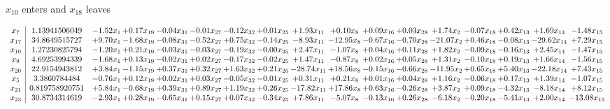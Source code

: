 \documentclass[9pt]{article}
\begin{document}
 $ x_{10} $ enters and $ x_{18} $ leaves 

 \[\begin{array}{c| c c@{\hskip 2pt} c@{\hskip 2pt} c@{\hskip 2pt} c@{\hskip 2pt} c@{\hskip 2pt} c@{\hskip 2pt} c@{\hskip 2pt} c@{\hskip 2pt} c@{\hskip 2pt} c@{\hskip 2pt} c@{\hskip 2pt} c@{\hskip 2pt} c@{\hskip 2pt} c@{\hskip 2pt} c@{\hskip 2pt} }
 x_{7}   &  1.13941506049 & -1.52 x_{1} & +  0.17 x_{19} & -0.04 x_{31} & -0.01 x_{27} & -0.12 x_{32} & +  0.01 x_{25} & +  1.93 x_{11} & +  0.10 x_{8} & +  0.09 x_{16} & +  0.03 x_{28} & +  1.74 x_{2} & -0.07 x_{18} & +  0.42 x_{13} & +  1.69 x_{14} & -1.48 x_{15}\\
 x_{17}   &  34.8649515727 & +  9.70 x_{1} & -1.68 x_{19} & -0.08 x_{31} & -0.52 x_{27} & +  0.75 x_{32} & -0.14 x_{25} & -8.93 x_{11} & -12.95 x_{8} & -0.67 x_{16} & -0.70 x_{28} & -21.07 x_{2} & +  0.46 x_{18} & -0.08 x_{13} & -29.62 x_{14} & +  7.29 x_{15}\\
 x_{10}   &  1.27230825794 & -1.20 x_{1} & +  0.21 x_{19} & -0.03 x_{31} & -0.03 x_{27} & -0.19 x_{32} & -0.00 x_{25} & +  2.47 x_{11} & -1.07 x_{8} & +  0.04 x_{16} & +  0.11 x_{28} & +  1.82 x_{2} & -0.09 x_{18} & -0.16 x_{13} & +  2.45 x_{14} & -1.47 x_{15}\\
 x_{9}   &  4.69253994339 & -1.68 x_{1} & +  0.13 x_{19} & -0.02 x_{31} & +  0.02 x_{27} & -0.17 x_{32} & -0.02 x_{25} & +  1.47 x_{11} & -0.87 x_{8} & +  0.02 x_{16} & +  0.05 x_{28} & +  1.31 x_{2} & -0.10 x_{18} & +  0.19 x_{13} & +  1.66 x_{14} & -1.56 x_{15}\\
 x_{20}   &  22.9154943812 & +  3.84 x_{1} & -1.15 x_{19} & +  0.37 x_{31} & +  0.32 x_{27} & +  1.63 x_{32} & +  0.21 x_{25} & -28.74 x_{11} & + 18.56 x_{8} & -0.15 x_{16} & -0.66 x_{28} & -11.95 x_{2} & +  0.65 x_{18} & +  5.40 x_{13} & -22.18 x_{14} & +  7.43 x_{15}\\
 x_{5}   &  3.3860784484 & -0.76 x_{1} & +  0.12 x_{19} & +  0.02 x_{31} & +  0.03 x_{27} & -0.05 x_{32} & -0.01 x_{25} & +  0.31 x_{11} & +  0.21 x_{8} & +  0.01 x_{16} & +  0.04 x_{28} & +  1.16 x_{2} & -0.06 x_{18} & +  0.17 x_{13} & +  1.39 x_{14} & -1.07 x_{15}\\
 x_{21}   &  0.819758920751 & +  5.84 x_{1} & -0.68 x_{19} & +  0.39 x_{31} & +  0.89 x_{27} & +  1.19 x_{32} & +  0.26 x_{25} & -17.82 x_{11} & + 17.86 x_{8} & +  0.63 x_{16} & -0.26 x_{28} & +  3.87 x_{2} & +  0.09 x_{18} & -4.32 x_{13} & -8.18 x_{14} & +  8.12 x_{15}\\
 x_{23}   &  30.8734314619 & -2.93 x_{1} & +  0.28 x_{19} & -0.65 x_{31} & +  0.15 x_{27} & +  0.07 x_{32} & -0.34 x_{25} & +  7.86 x_{11} & -5.07 x_{8} & -0.13 x_{16} & +  0.26 x_{28} & -6.18 x_{2} & -0.20 x_{18} & -5.41 x_{13} & +  2.00 x_{14} & -13.08 x_{15}\\

\end{array}\]
\end{document}
